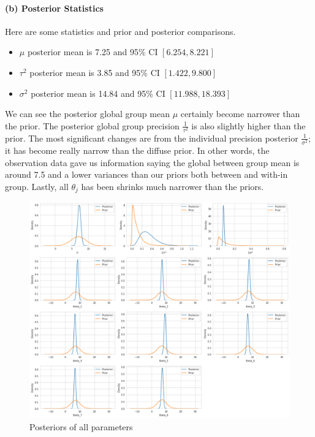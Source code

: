 \documentclass[11pt, letterpaper]{article}
\begin{document}
\paragraph{(b) Posterior Statistics}
Here are some statistics and prior and posterior comparisons.
\begin{itemize}
    \item $\mu$ posterior mean is 7.25 and 95\% CI $[6.254, 8.221]$
    \item $\tau^2$ posterior mean is 3.85 and 95\% CI $[1.422, 9.800]$
    \item $\sigma^2$ posterior mean is 14.84 and 95\% CI $[11.988, 18.393]$
\end{itemize}
We can see the posterior global group mean $\mu$ certainly become narrower than the prior. The posterior global group precision $\frac{1}{\tau^2}$ is also slightly higher than the prior. The most significant changes are from the individual precision posterior $\frac{1}{\sigma^2}$; it has become really narrow than the diffuse prior. In other words, the observation data gave us information saying the global between group mean is around 7.5 and a lower variances than our priors both between and with-in group. Lastly, all $\theta_j$ has been shrinks much narrower than the priors.
\begin{figure}[!h]
  \centering
  \includegraphics[width=1.0\textwidth]{3.b.png}
  \captionsetup{justification=centering}
  \caption{Posteriors of all parameters}
\end{figure}
\end{document}
